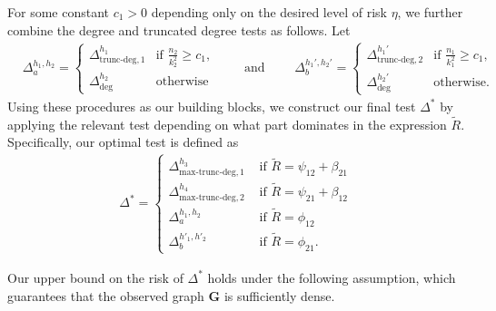 \documentclass{article}
\newcommand{\bG}{\mathbf{G}}
\newcommand{\lin}{\text{deg}}
\newcommand{\chisqlin}{\text{trunc-deg}}
\newcommand{\chisqmax}{\text{max-trunc-deg}}
\begin{document}
For some constant $c_1>0$ depending only on the desired level of risk $\eta$, we further combine the degree and truncated degree tests as follows. Let %
\begin{align*}
    &\Delta_a^{h_1,h_2} = \begin{cases}
        \Delta^{h_1}_{\chisqlin, 1} & \text{if  $\frac{n_2}{k_2^2} \geq c_1$,} \\ \Delta^{h_2}_{\lin} & \text{otherwise}
    \end{cases} \qquad \text{ and } 
    \qquad \Delta_b^{h_1',h_2'} = \begin{cases}
        \Delta^{h_1'}_{\chisqlin, 2} & \text{if  $\frac{n_1}{k_1^2} \geq c_1$,} \\ \Delta^{h_2'}_{\lin} & \text{otherwise.}
    \end{cases} 
\end{align*}
Using these procedures as our building blocks, we construct our final test $\Delta^*$ by applying the relevant test depending on what part dominates in the expression $\tilde R$. Specifically, our optimal test is defined as
\begin{align*}
    \Delta^* = \begin{cases}
        \Delta^{h_3}_{\chisqmax, 1}& \text{ if } \tilde R = \psi_{12} + \beta_{21}\\
        \Delta^{h_4}_{\chisqmax, 2}& \text{ if } \tilde R = \psi_{21} + \beta_{12} \\
        \Delta_a^{h_1, h_2} & \text{ if } \tilde R = \phi_{12}\\
        \Delta_b^{h'_1, h'_2} & \text{ if } \tilde R = \phi_{21}.
    \end{cases}
\end{align*}


Our upper bound on the risk of $\Delta^*$ holds under the following assumption, which guarantees that the observed graph $\bG$  is sufficiently dense.
\end{document}
